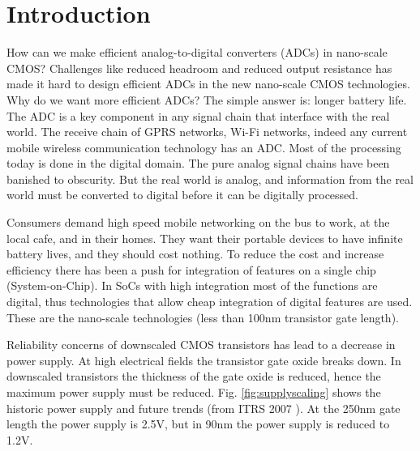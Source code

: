 \chapter{Introduction}\label{sc:intro}


How can we make efficient analog-to-digital converters (ADCs) in nano-scale
CMOS?
Challenges like reduced headroom and reduced output resistance has
made it hard to design efficient ADCs in the new nano-scale CMOS technologies.
Why do we want more efficient ADCs? The simple answer is: longer
battery life. The ADC is a key component in any signal chain that
interface with the real world. The receive chain of GPRS networks, Wi-Fi
networks, indeed any current mobile wireless communication technology has an
ADC. Most of the processing today is done in the digital
domain. The pure analog signal chains have been banished to obscurity. But the real world
is analog, and information from the real world must be converted to
digital before it can be digitally processed.

Consumers demand high speed mobile networking on 
the bus to work, at the local cafe, and in their homes. They want 
their portable devices
to have infinite battery lives, and they should cost nothing. 
To
reduce the cost and increase efficiency there has been a push for
integration of features on a single chip (System-on-Chip). 
In SoCs with high integration most of the functions are digital, thus
technologies that allow cheap integration of digital features are
used. These are the nano-scale technologies (less than 100nm
transistor gate length). 



Reliability concerns of downscaled CMOS transistors has lead to a
decrease in power supply. At high electrical fields the transistor
gate oxide breaks down. In downscaled transistors the thickness of
the gate oxide is reduced, hence the maximum power supply  must be
reduced. Fig. \ref{fig:supplyscaling} shows the historic power supply  and
  future trends (from ITRS 2007 \cite{itrs07}). At the 250nm gate
  length the power supply is 2.5V, but in 90nm  the power supply
  is reduced to 1.2V.

